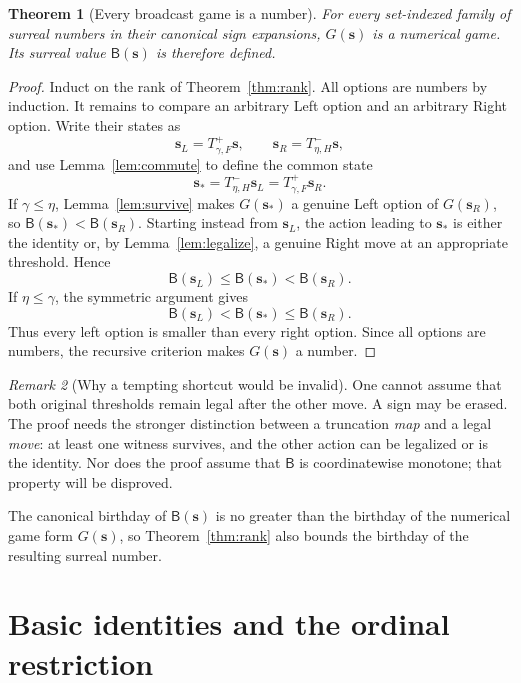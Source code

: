 \documentclass[11pt,letterpaper]{article}
\newtheorem{theorem}{Theorem}[section]
\theoremstyle{definition}
\theoremstyle{remark}
\newtheorem{remark}[theorem]{Remark}
\newcommand{\BB}{\mathsf B}
\newcommand{\bs}{\boldsymbol{s}}
\begin{document}
\begin{theorem}[Every broadcast game is a number]\label{thm:number}
For every set-indexed family of surreal numbers in their canonical sign
expansions, $G(\bs)$ is a numerical game. Its surreal value $\BB(\bs)$ is
therefore defined.
\end{theorem}
\begin{proof}
Induct on the rank of Theorem~\ref{thm:rank}. All options are numbers by
induction. It remains to compare an arbitrary Left option and an arbitrary
Right option. Write their states as
\[
 \bs_L=T^+_{\gamma,F}\bs,\qquad
 \bs_R=T^-_{\eta,H}\bs,
\]
and use Lemma~\ref{lem:commute} to define the common state
\[
 \bs_* = T^-_{\eta,H}\bs_L=T^+_{\gamma,F}\bs_R.
\]
If $\gamma\leq\eta$, Lemma~\ref{lem:survive} makes $G(\bs_*)$ a genuine Left
option of $G(\bs_R)$, so
$\BB(\bs_*)<\BB(\bs_R)$. Starting instead from $\bs_L$, the action leading to
$\bs_*$ is either the identity or, by Lemma~\ref{lem:legalize}, a genuine Right
move at an appropriate threshold. Hence
\[
                   \BB(\bs_L)\leq\BB(\bs_*)<\BB(\bs_R).
\]
If $\eta\leq\gamma$, the symmetric argument gives
\[
                   \BB(\bs_L)<\BB(\bs_*)\leq\BB(\bs_R).
\]
Thus every left option is smaller than every right option. Since all options
are numbers, the recursive criterion makes $G(\bs)$ a number.
\end{proof}

\begin{remark}[Why a tempting shortcut would be invalid]
One cannot assume that both original thresholds remain legal after the other
move. A sign may be erased. The proof needs the stronger distinction between a
truncation \emph{map} and a legal \emph{move}: at least one witness survives,
and the other action can be legalized or is the identity. Nor does the proof
assume that $\BB$ is coordinatewise monotone; that property will be disproved.
\end{remark}

The canonical birthday of $\BB(\bs)$ is no greater than the birthday of the
numerical game form $G(\bs)$, so Theorem~\ref{thm:rank} also bounds the birthday
of the resulting surreal number.

\section{Basic identities and the ordinal restriction}\label{sec:basic}
\end{document}
